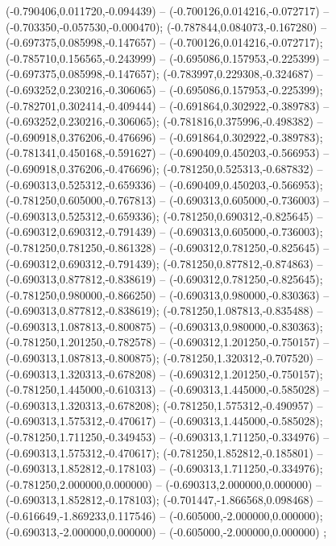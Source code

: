  (-0.790406,0.011720,-0.094439) -- (-0.700126,0.014216,-0.072717) -- (-0.703350,-0.057530,-0.000470);
 (-0.787844,0.084073,-0.167280) -- (-0.697375,0.085998,-0.147657) -- (-0.700126,0.014216,-0.072717);
 (-0.785710,0.156565,-0.243999) -- (-0.695086,0.157953,-0.225399) -- (-0.697375,0.085998,-0.147657);
 (-0.783997,0.229308,-0.324687) -- (-0.693252,0.230216,-0.306065) -- (-0.695086,0.157953,-0.225399);
 (-0.782701,0.302414,-0.409444) -- (-0.691864,0.302922,-0.389783) -- (-0.693252,0.230216,-0.306065);
 (-0.781816,0.375996,-0.498382) -- (-0.690918,0.376206,-0.476696) -- (-0.691864,0.302922,-0.389783);
 (-0.781341,0.450168,-0.591627) -- (-0.690409,0.450203,-0.566953) -- (-0.690918,0.376206,-0.476696);
 (-0.781250,0.525313,-0.687832) -- (-0.690313,0.525312,-0.659336) -- (-0.690409,0.450203,-0.566953);
 (-0.781250,0.605000,-0.767813) -- (-0.690313,0.605000,-0.736003) -- (-0.690313,0.525312,-0.659336);
 (-0.781250,0.690312,-0.825645) -- (-0.690312,0.690312,-0.791439) -- (-0.690313,0.605000,-0.736003);
 (-0.781250,0.781250,-0.861328) -- (-0.690312,0.781250,-0.825645) -- (-0.690312,0.690312,-0.791439);
 (-0.781250,0.877812,-0.874863) -- (-0.690313,0.877812,-0.838619) -- (-0.690312,0.781250,-0.825645);
 (-0.781250,0.980000,-0.866250) -- (-0.690313,0.980000,-0.830363) -- (-0.690313,0.877812,-0.838619);
 (-0.781250,1.087813,-0.835488) -- (-0.690313,1.087813,-0.800875) -- (-0.690313,0.980000,-0.830363);
 (-0.781250,1.201250,-0.782578) -- (-0.690312,1.201250,-0.750157) -- (-0.690313,1.087813,-0.800875);
 (-0.781250,1.320312,-0.707520) -- (-0.690313,1.320313,-0.678208) -- (-0.690312,1.201250,-0.750157);
 (-0.781250,1.445000,-0.610313) -- (-0.690313,1.445000,-0.585028) -- (-0.690313,1.320313,-0.678208);
 (-0.781250,1.575312,-0.490957) -- (-0.690313,1.575312,-0.470617) -- (-0.690313,1.445000,-0.585028);
 (-0.781250,1.711250,-0.349453) -- (-0.690313,1.711250,-0.334976) -- (-0.690313,1.575312,-0.470617);
 (-0.781250,1.852812,-0.185801) -- (-0.690313,1.852812,-0.178103) -- (-0.690313,1.711250,-0.334976);
 (-0.781250,2.000000,0.000000) -- (-0.690313,2.000000,0.000000) -- (-0.690313,1.852812,-0.178103);
 (-0.701447,-1.866568,0.098468) -- (-0.616649,-1.869233,0.117546) -- (-0.605000,-2.000000,0.000000);
 (-0.690313,-2.000000,0.000000) -- (-0.605000,-2.000000,0.000000) ;
